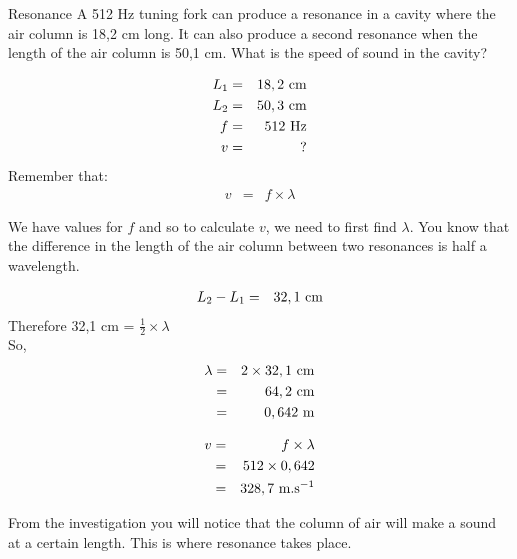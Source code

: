 \begin{wex}{Resonance}
{A 512 Hz tuning fork can produce a resonance in a cavity where the air column is 18,2 cm long. It can also produce
a second resonance when the length of the air column is 50,1 cm. What is the speed of sound in the cavity?}
{
\begin{eqnarray*}
L_{1} &=& 18,2 \ \rm{cm} \\
L_{2} &=& 50,3 \ \rm{cm} \\
f &=& 512 \ \rm{Hz} \\
v &=& ?
\end{eqnarray*}
Remember that:
\begin{eqnarray*}
v &=& f \times \lambda
\end{eqnarray*}

We have values for $f$ and so to calculate $v$, we need to first find $\lambda$.
You know that the difference in the length of the air column between two resonances is half a wavelength.

\begin{eqnarray*}
L_{2} - L_{1} &=& 32,1 \ \rm{cm}
\end{eqnarray*}
Therefore 32,1 cm = $\frac{1}{2}\times \lambda$\\
So,
\begin{eqnarray*}
\lambda &=& 2 \times 32,1 \ \rm{cm} \\
&=& 64,2 \ \rm{cm} \\
&=& 0,642 \ \rm{m}
\end{eqnarray*}

\begin{eqnarray*}
v &=& f \times \lambda \\
&=& 512 \times 0,642 \\
&=& 328,7 \ \rm{m.s}^{-1}
\end{eqnarray*}
}
\end{wex}

From the investigation you will notice that the column of air will make a sound at a certain length.
This is where resonance takes place.

